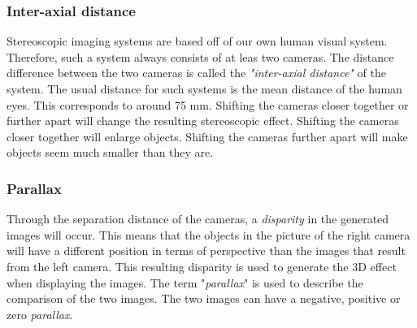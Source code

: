 \subsubsection{Inter-axial distance}
Stereoscopic imaging systems are based off of our own human visual system. Therefore, such a system always consists of at leas two cameras. The distance difference between the two cameras is called the \textit{"inter-axial distance"} of the system. The usual distance for such systems is the mean distance of the human eyes. This corresponds to around 75 mm. Shifting the cameras closer together or further apart will change the resulting stereoscopic effect. Shifting the cameras closer together will enlarge objects. Shifting the cameras further apart will make objects seem much smaller than they are. 
\subsubsection{Parallax}
Through the separation distance of the cameras, a \textit{disparity} in the generated images will occur. This means that the objects in the picture of the right camera will have a different position in terms of perspective than the images that result from the left camera. This resulting disparity is used to generate the 3D effect when displaying the images. The term "\textit{parallax}" is used to describe the comparison of the two images. The two images can have a negative, positive or zero \textit{parallax}.
